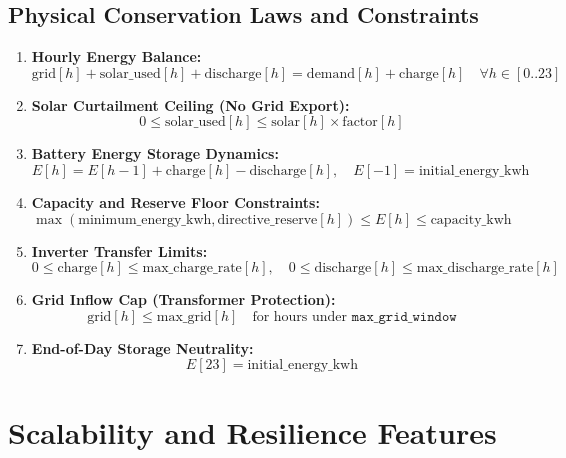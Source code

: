 \documentclass[11pt,a4paper]{article}
\begin{document}
\subsection{Physical Conservation Laws and Constraints}
\begin{enumerate}
    \item \textbf{Hourly Energy Balance:}
    \begin{equation}
    \text{grid}[h] + \text{solar\_used}[h] + \text{discharge}[h] = \text{demand}[h] + \text{charge}[h] \quad \forall h \in [0..23]
    \end{equation}
    \item \textbf{Solar Curtailment Ceiling (No Grid Export):}
    \begin{equation}
    0 \le \text{solar\_used}[h] \le \text{solar}[h] \times \text{factor}[h]
    \end{equation}
    \item \textbf{Battery Energy Storage Dynamics:}
    \begin{equation}
    E[h] = E[h-1] + \text{charge}[h] - \text{discharge}[h], \quad E[-1] = \text{initial\_energy\_kwh}
    \end{equation}
    \item \textbf{Capacity and Reserve Floor Constraints:}
    \begin{equation}
    \max(\text{minimum\_energy\_kwh}, \text{directive\_reserve}[h]) \le E[h] \le \text{capacity\_kwh}
    \end{equation}
    \item \textbf{Inverter Transfer Limits:}
    \begin{equation}
    0 \le \text{charge}[h] \le \text{max\_charge\_rate}[h], \quad 0 \le \text{discharge}[h] \le \text{max\_discharge\_rate}[h]
    \end{equation}
    \item \textbf{Grid Inflow Cap (Transformer Protection):}
    \begin{equation}
    \text{grid}[h] \le \text{max\_grid}[h] \quad \text{for hours under } \texttt{max\_grid\_window}
    \end{equation}
    \item \textbf{End-of-Day Storage Neutrality:}
    \begin{equation}
    E[23] = \text{initial\_energy\_kwh}
    \end{equation}
\end{enumerate}

\section{Scalability and Resilience Features}
\end{document}
